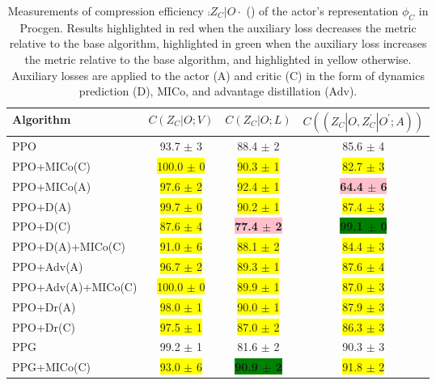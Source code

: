 \begin{table}[!h]
\caption{Measurements of compression efficiency $\comp{Z_C \vert O}{\cdot}$ () of the actor's representation $\phi_C$ in Procgen. Results highlighted in red when the auxiliary loss decreases the metric relative to the base algorithm, highlighted in green when the auxiliary loss increases the metric relative to the base algorithm, and highlighted in yellow otherwise. Auxiliary losses are applied to the actor  (A) and critic (C) in the form of dynamics prediction (D), MICo, and advantage distillation (Adv).}
\label{c2:tab:critic-C}
\begin{center}
\begin{tabular}{l|c|c|c}
\textbf{Algorithm} & $C(Z_C \vert O;V)$ & $C(Z_C \vert O;L)$ & $C((Z_C|O,Z^{\prime}_C | O^{\prime};A))$
\\ \hline
PPO & 93.7 $\pm$ 3 & 88.4 $\pm$ 2 & 85.6 $\pm$ 4 \\
PPO+MICo(C) & \colorbox{yellow}{100.0 $\pm$ 0 } & \colorbox{yellow}{90.3 $\pm$ 1 } & \colorbox{yellow}{82.7 $\pm$ 3 } \\ 
PPO+MICo(A) & \colorbox{yellow}{97.6 $\pm$ 2 } & \colorbox{yellow}{92.4 $\pm$ 1 } & \textbf{\colorbox{pink}{64.4 $\pm$ 6 }} \\ 
PPO+D(A) & \colorbox{yellow}{99.7 $\pm$ 0 } & \colorbox{yellow}{90.2 $\pm$ 1 } & \colorbox{yellow}{87.4 $\pm$ 3 } \\ 
PPO+D(C) & \colorbox{yellow}{87.6 $\pm$ 4 } & \textbf{\colorbox{pink}{77.4 $\pm$ 2 }} & \textbf{\colorbox{green}{99.1 $\pm$ 0 }} \\ 
PPO+D(A)+MICo(C) & \colorbox{yellow}{91.0 $\pm$ 6 } & \colorbox{yellow}{88.1 $\pm$ 2 } & \colorbox{yellow}{84.4 $\pm$ 3 } \\ 
PPO+Adv(A) & \colorbox{yellow}{96.7 $\pm$ 2 } & \colorbox{yellow}{89.3 $\pm$ 1 } & \colorbox{yellow}{87.6 $\pm$ 4 } \\ 
PPO+Adv(A)+MICo(C) & \colorbox{yellow}{100.0 $\pm$ 0 } & \colorbox{yellow}{89.9 $\pm$ 1 } & \colorbox{yellow}{87.0 $\pm$ 3 } \\ 
PPO+Dr(A) & \colorbox{yellow}{98.0 $\pm$ 1 } & \colorbox{yellow}{90.0 $\pm$ 1 } & \colorbox{yellow}{87.9 $\pm$ 3 } \\ 
PPO+Dr(C) & \colorbox{yellow}{97.5 $\pm$ 1 } & \colorbox{yellow}{87.0 $\pm$ 2 } & \colorbox{yellow}{86.3 $\pm$ 3 } \\ \hline
PPG & 99.2 $\pm$ 1 & 81.6 $\pm$ 2 & 90.3 $\pm$ 3 \\
PPG+MICo(C) & \colorbox{yellow}{93.0 $\pm$ 6 } & \textbf{\colorbox{green}{90.9 $\pm$ 2 }} & \colorbox{yellow}{91.8 $\pm$ 2 } \\ 

\end{tabular}
\end{center}
\end{table}
